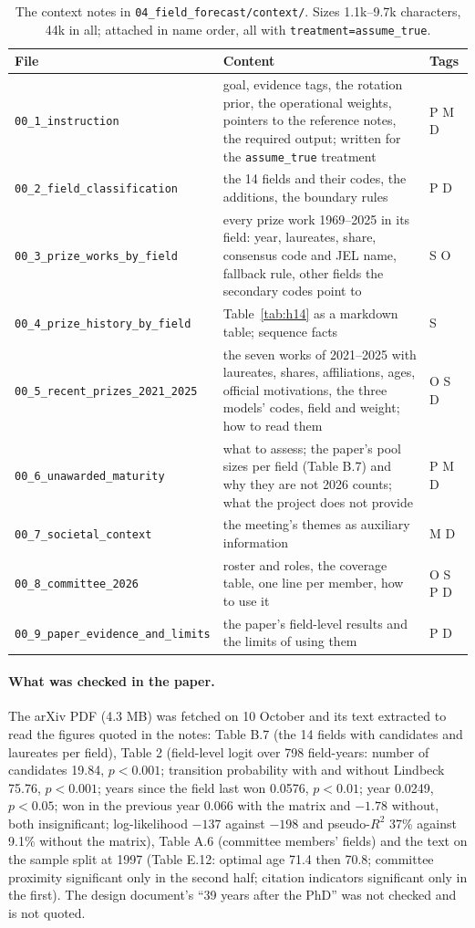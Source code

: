 \documentclass[11pt,a4paper]{article}
\newcommand{\code}[1]{\texttt{#1}}
\begin{document}
\begin{table}[h]
\small
\begin{tabularx}{\textwidth}{@{}lLl@{}}
\toprule
File & Content & Tags \\
\midrule
\code{00\_1\_instruction} & goal, evidence tags, the rotation prior, the operational weights, pointers to the reference notes, the required output; written for the \code{assume\_true} treatment & P M D \\
\code{00\_2\_field\_classification} & the 14 fields and their codes, the additions, the boundary rules & P D \\
\code{00\_3\_prize\_works\_by\_field} & every prize work 1969--2025 in its field: year, laureates, share, consensus code and JEL name, fallback rule, other fields the secondary codes point to & S O \\
\code{00\_4\_prize\_history\_by\_field} & Table~\ref{tab:h14} as a markdown table; sequence facts & S \\
\code{00\_5\_recent\_prizes\_2021\_2025} & the seven works of 2021--2025 with laureates, shares, affiliations, ages, official motivations, the three models' codes, field and weight; how to read them & O S D \\
\code{00\_6\_unawarded\_maturity} & what to assess; the paper's pool sizes per field (Table B.7) and why they are not 2026 counts; what the project does not provide & P M D \\
\code{00\_7\_societal\_context} & the meeting's themes as auxiliary information & M D \\
\code{00\_8\_committee\_2026} & roster and roles, the coverage table, one line per member, how to use it & O S P D \\
\code{00\_9\_paper\_evidence\_and\_limits} & the paper's field-level results and the limits of using them & P D \\
\bottomrule
\end{tabularx}
\caption{The context notes in \code{04\_field\_forecast/context/}. Sizes 1.1k--9.7k characters, 44k in all; attached in name order, all with \code{treatment=assume\_true}.}
\end{table}

\paragraph{What was checked in the paper.} The arXiv PDF (4.3 MB) was fetched on 10 October and its text extracted
to read the figures quoted in the notes: Table B.7 (the 14 fields with candidates and laureates per field), Table 2
(field-level logit over 798 field-years: number of candidates 19.84, $p<0.001$; transition probability with and
without Lindbeck 75.76, $p<0.001$; years since the field last won 0.0576, $p<0.01$; year 0.0249, $p<0.05$; won in
the previous year 0.066 with the matrix and $-1.78$ without, both insignificant; log-likelihood $-137$ against $-198$
and pseudo-$R^2$ 37\% against 9.1\% without the matrix), Table A.6 (committee members' fields) and the text on the
sample split at 1997 (Table E.12: optimal age 71.4 then 70.8; committee proximity significant only in the second
half; citation indicators significant only in the first). The design document's ``39 years after the PhD'' was not
checked and is not quoted.
\end{document}
